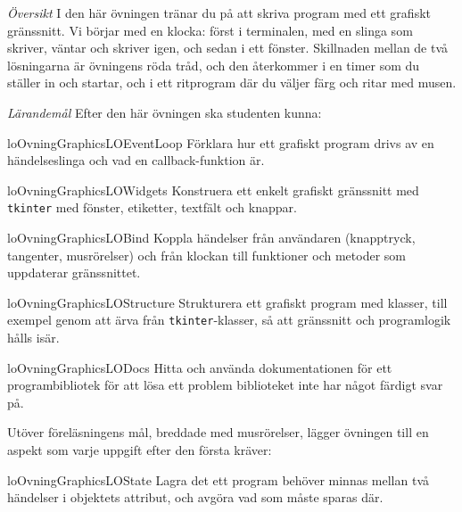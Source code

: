 \emph{Översikt}
I den här övningen tränar du på att skriva program med ett grafiskt
gränssnitt.  Vi börjar med en klocka: först i terminalen, med en slinga
som skriver, väntar och skriver igen, och sedan i ett fönster.
Skillnaden mellan de två
lösningarna är övningens röda tråd, och den återkommer i en timer som du
ställer in och startar, och i ett ritprogram där du väljer färg och
ritar med musen.

\emph{Lärandemål}
Efter den här övningen ska studenten kunna:
\begin{restatable}{lo}{OvningGraphicsLOEventLoop}%
  \label{OvningGraphicsLOEventLoop}%
  Förklara hur ett grafiskt program drivs av en händelseslinga och vad en
  \foreignlanguage{english}{callback}-funktion är.
\end{restatable}
\begin{restatable}{lo}{OvningGraphicsLOWidgets}%
  \label{OvningGraphicsLOWidgets}%
  Konstruera ett enkelt grafiskt gränssnitt med
  \texttt{tkinter} med fönster, etiketter, textfält och
  knappar.
\end{restatable}
\begin{restatable}{lo}{OvningGraphicsLOBind}%
  \label{OvningGraphicsLOBind}%
  Koppla händelser från användaren (knapptryck, tangenter, musrörelser)
  och från klockan till funktioner och metoder som uppdaterar
  gränssnittet.
\end{restatable}
\begin{restatable}{lo}{OvningGraphicsLOStructure}%
  \label{OvningGraphicsLOStructure}%
  Strukturera ett grafiskt program med klasser, till exempel genom att
  ärva från \texttt{tkinter}-klasser, så att gränssnitt och
  programlogik hålls isär.
\end{restatable}
\begin{restatable}{lo}{OvningGraphicsLODocs}%
  \label{OvningGraphicsLODocs}%
  Hitta och använda dokumentationen för ett programbibliotek för att
  lösa ett problem biblioteket inte har något färdigt svar på.
\end{restatable}
Utöver föreläsningens mål, breddade med musrörelser, lägger övningen
till en aspekt som varje uppgift efter den första kräver:
\begin{restatable}{lo}{OvningGraphicsLOState}%
  \label{OvningGraphicsLOState}%
  Lagra det ett program behöver minnas mellan två händelser i objektets
  attribut, och avgöra vad som måste sparas där.
\end{restatable}

